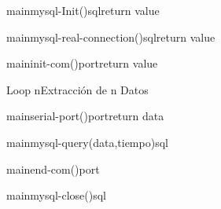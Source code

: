 \begin {sequencediagram}

\begin{call}{main}{mysql-Init()}{sql}{return value}
\end{call}
\begin{call}{main}{mysql-real-connection()}{sql}{return value}
\end{call}
\begin {call}{main}{init-com()}{port}{return value}
\end {call}
\begin{sdblock}{Loop n}{Extracción de n Datos}
	\begin{call}{main}{serial-port()}{port}{return data}
	\end{call}
    \begin{call}{main}{mysql-query(data,tiempo)}{sql}{}
	\end{call}
\end{sdblock}
\begin{call}{main}{end-com()}{port}{ }
\end{call}
\begin{call}{main}{mysql-close()}{sql}{}
\end{call}

\end {sequencediagram}
